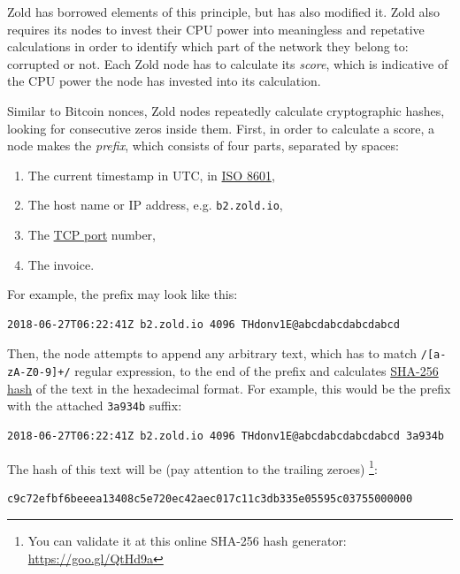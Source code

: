 \documentclass[11pt,oneside]{article}
\newcommand\dd[1]{\colorbox{gray!30}{\texttt{#1}}}
\begin{document}
Zold has borrowed elements of this principle, but has also modified it. Zold also requires
its nodes to invest their CPU power into meaningless and repetative
calculations in order to identify which part of the network they belong to:
corrupted or not. Each Zold node has to calculate its \emph{score},
which is indicative of the CPU power the node has invested into its calculation.

Similar to Bitcoin nonces, Zold nodes repeatedly calculate cryptographic hashes,
looking for consecutive zeros inside them. First, in order to calculate a score,
a node makes the \emph{prefix}, which consists of four parts,
separated by spaces:

\begin{enumerate}
\item The current timestamp in UTC, in \href{https://en.wikipedia.org/wiki/ISO_8601}{ISO 8601},
\item The host name or IP address, e.g. \dd{b2.zold.io},
\item The \href{https://en.wikipedia.org/wiki/Port_(computer_networking)}{TCP port} number,
\item The invoice.
\end{enumerate}

For example, the prefix may look like this:

\begin{verbatim}
2018-06-27T06:22:41Z b2.zold.io 4096 THdonv1E@abcdabcdabcdabcd
\end{verbatim}

Then, the node attempts to append any arbitrary text, which has to match
\dd{/[a-zA-Z0-9]+/} regular expression, to the end of the prefix and calculates
\href{https://en.wikipedia.org/wiki/SHA-2}{SHA-256 hash}
of the text in the hexadecimal format. For example, this would be the prefix
with the attached \dd{3a934b} suffix:

\begin{verbatim}
2018-06-27T06:22:41Z b2.zold.io 4096 THdonv1E@abcdabcdabcdabcd 3a934b
\end{verbatim}

The hash of this text will be (pay attention to the trailing zeroes)%
\footnote{You can validate it at this online SHA-256 hash generator:
\url{https://goo.gl/QtHd9a}}:

\begin{verbatim}
c9c72efbf6beeea13408c5e720ec42aec017c11c3db335e05595c03755000000
\end{verbatim}
\end{document}
